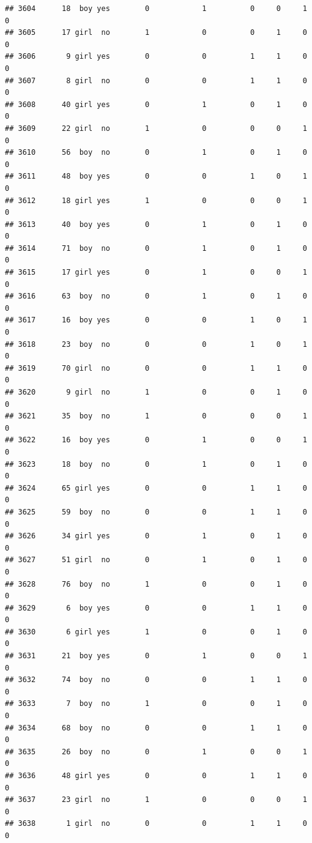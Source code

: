 \documentclass[man]{apa6}
\begin{document}
\begin{verbatim}
## 3604      18  boy yes        0            1          0     0     1     0
## 3605      17 girl  no        1            0          0     1     0     0
## 3606       9 girl yes        0            0          1     1     0     0
## 3607       8 girl  no        0            0          1     1     0     0
## 3608      40 girl yes        0            1          0     1     0     0
## 3609      22 girl  no        1            0          0     0     1     0
## 3610      56  boy  no        0            1          0     1     0     0
## 3611      48  boy yes        0            0          1     0     1     0
## 3612      18 girl yes        1            0          0     0     1     0
## 3613      40  boy yes        0            1          0     1     0     0
## 3614      71  boy  no        0            1          0     1     0     0
## 3615      17 girl yes        0            1          0     0     1     0
## 3616      63  boy  no        0            1          0     1     0     0
## 3617      16  boy yes        0            0          1     0     1     0
## 3618      23  boy  no        0            0          1     0     1     0
## 3619      70 girl  no        0            0          1     1     0     0
## 3620       9 girl  no        1            0          0     1     0     0
## 3621      35  boy  no        1            0          0     0     1     0
## 3622      16  boy yes        0            1          0     0     1     0
## 3623      18  boy  no        0            1          0     1     0     0
## 3624      65 girl yes        0            0          1     1     0     0
## 3625      59  boy  no        0            0          1     1     0     0
## 3626      34 girl yes        0            1          0     1     0     0
## 3627      51 girl  no        0            1          0     1     0     0
## 3628      76  boy  no        1            0          0     1     0     0
## 3629       6  boy yes        0            0          1     1     0     0
## 3630       6 girl yes        1            0          0     1     0     0
## 3631      21  boy yes        0            1          0     0     1     0
## 3632      74  boy  no        0            0          1     1     0     0
## 3633       7  boy  no        1            0          0     1     0     0
## 3634      68  boy  no        0            0          1     1     0     0
## 3635      26  boy  no        0            1          0     0     1     0
## 3636      48 girl yes        0            0          1     1     0     0
## 3637      23 girl  no        1            0          0     0     1     0
## 3638       1 girl  no        0            0          1     1     0     0

\end{verbatim}
\end{document}
